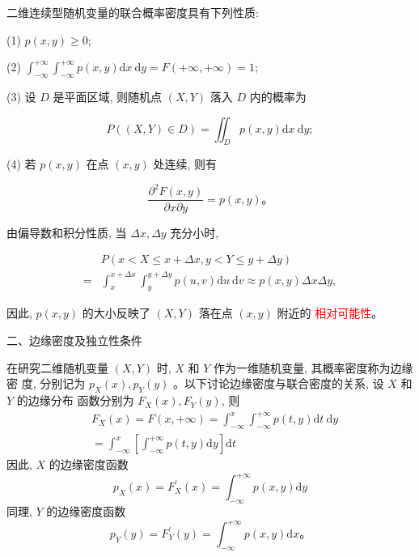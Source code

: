 \documentclass{beamer}
\newcommand{\new}[1]{\textcolor{red}{#1}}
\begin{document}
	\begin{frame}
		二维连续型随机变量的联合概率密度具有下列性质:
		
		(1) $p(x, y) \geqslant 0$;
		
		(2) $\int_{-\infty}^{+\infty} \int_{-\infty}^{+\infty} p(x, y) \mathrm{d} x \mathrm{~d} y=F(+\infty,+\infty)=1$;
		
		(3) 设 $D$ 是平面区域, 则随机点 $(X, Y)$ 落入 $D$ 内的概率为
		
		$$
		P((X, Y) \in D)=\iint_{D} p(x, y) \mathrm{d} x \mathrm{~d} y ;
		$$
		
		(4) 若 $p(x, y)$ 在点 $(x, y)$ 处连续, 则有
		
		$$
		\frac{\partial^{2} F(x, y)}{\partial x \partial y}=p(x, y) 。
		$$
		
		由偏导数和积分性质, 当 $\Delta x, \Delta y$ 充分小时,
		
		$$
		\begin{aligned}
			& P(x<X \leqslant x+\Delta x, y<Y \leqslant y+\Delta y) \\
			= & \int_{x}^{x+\Delta x} \int_{y}^{y+\Delta y} p(u, v) \mathrm{d} u \mathrm{~d} v \approx p(x, y) \Delta x \Delta y,
		\end{aligned}
		$$
		
		因此, $p(x, y)$ 的大小反映了 $(X, Y)$ 落在点 $(x, y)$ 附近的
		\new{相对可能性}。
	\end{frame}
	
	\begin{frame}
		二、边缘密度及独立性条件
		
		在研究二维随机变量 $(X, Y)$ 时, $X$ 和 $Y$ 作为一维随机变量, 其概率密度称为边缘密 度, 分别记为 $p_{X}(x), p_{Y}(y)$ 。以下讨论边缘密度与联合密度的关系, 设 $X$ 和 $Y$ 的边缘分布 函数分别为 $F_{X}(x), F_{Y}(y)$, 则
		\begin{align}
			&F_{X}(x)=F(x,+\infty)=\int_{-\infty}^{x} \int_{-\infty}^{+\infty} p(t, y) \mathrm{d} t \mathrm{~d} y \\
			&=\int_{-\infty}^{x}\left[\int_{-\infty}^{+\infty} p(t, y) \mathrm{d} y\right] \mathrm{d} t
		\end{align}
		因此, $X$ 的边缘密度函数	
		$$
		p_{X}(x)=F_{X}^{\prime}(x)=\int_{-\infty}^{+\infty} p(x, y) \mathrm{d} y
		$$
		同理, $Y$ 的边缘密度函数
		$$
		p_{Y}(y)=F_{Y}^{\prime}(y)=\int_{-\infty}^{+\infty} p(x, y) \mathrm{d} x 。
		$$
	\end{frame}
	
\end{document}
